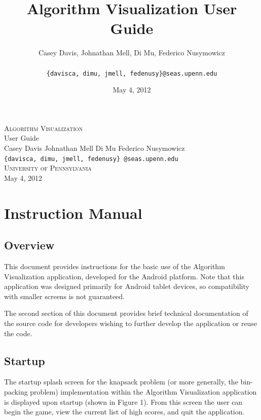 \documentclass[11pt]{article}
\title{Algorithm Visualization User Guide\\}
\author{Casey Davis, Johnathan Mell, Di Mu, Federico Nusymowicz \\\\
\texttt{\{davisca, dimu, jmell, fedenusy\}@seas.upenn.edu}}
\date{May 4, 2012}
\begin{document}
\begin{titlepage}
\begin{center}
\vspace*{\fill}

\textsc{\Huge Algorithm Visualization}\\[0.75cm]

\huge User Guide\\[1.25cm]

\large Casey Davis \;\;\;\; Johnathan Mell \;\;\;\;   Di Mu \;\;\;\;   Federico
Nusymowicz \\[0.5cm]

\large \texttt{\{davisca, dimu, jmell, fedenusy\} @seas.upenn.edu} \\[1.75cm]

\large \textsc{University of Pennsylvania} \\[0.5cm]

\large May 4, 2012

\vspace*{\fill}
\end{center}
\end{titlepage}

\section{Instruction Manual}

\subsection{Overview}

This document provides instructions for the basic use of the Algorithm
Visualization application, developed for the Android platform.  Note that
this application was designed primarily for Android tablet devices, so
compatibility with smaller screens is not guaranteed.

The second section of this document provides brief technical documentation of
the source code for developers wishing to further develop the application
or reuse the code.

\subsection{Startup}

The startup splash screen for the knapsack problem (or more generally, the
bin-packing problem) implementation within the Algorithm Visualization
application is displayed upon startup (shown in Figure 1).  From this screen
the user can begin the game, view the current list of high scores, and quit
the application.\\
\end{document}
